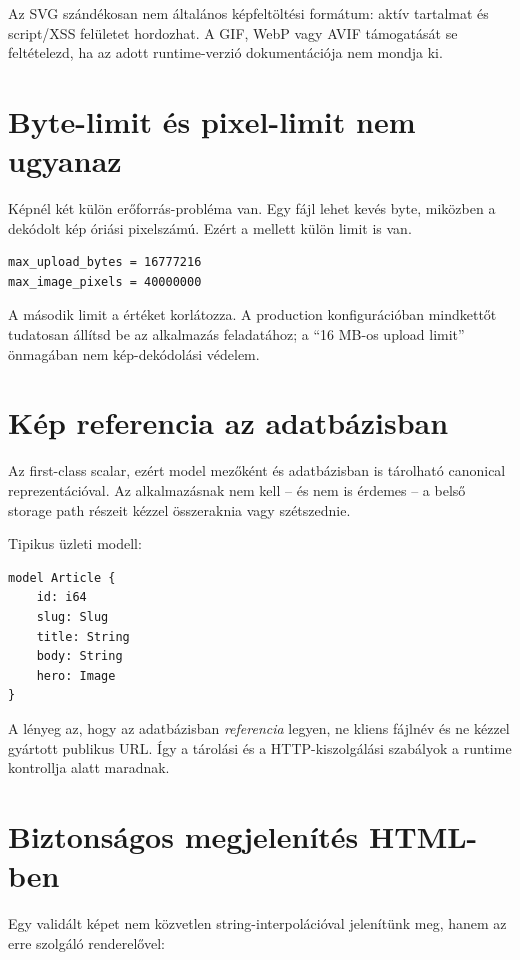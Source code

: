 Az SVG szándékosan nem általános képfeltöltési formátum: aktív tartalmat és script/XSS felületet hordozhat. A GIF, WebP vagy AVIF támogatását se feltételezd, ha az adott runtime-verzió dokumentációja nem mondja ki.

\section{Byte-limit és pixel-limit nem ugyanaz}

Képnél két külön erőforrás-probléma van. Egy fájl lehet kevés byte, miközben a dekódolt kép óriási pixelszámú. Ezért a  mellett külön  limit is van.

\begin{lstlisting}
max_upload_bytes = 16777216
max_image_pixels = 40000000
\end{lstlisting}

A második limit a  értéket korlátozza. A production konfigurációban mindkettőt tudatosan állítsd be az alkalmazás feladatához; a ``16 MB-os upload limit'' önmagában nem kép-dekódolási védelem.

\section{Kép referencia az adatbázisban}

Az  first-class scalar, ezért model mezőként és adatbázisban is tárolható canonical reprezentációval. Az alkalmazásnak nem kell -- és nem is érdemes -- a belső storage path részeit kézzel összeraknia vagy szétszednie.

Tipikus üzleti modell:

\begin{lstlisting}[language=Velran]
model Article {
    id: i64
    slug: Slug
    title: String
    body: String
    hero: Image
}
\end{lstlisting}

A lényeg az, hogy az adatbázisban \emph{referencia} legyen, ne kliens fájlnév és ne kézzel gyártott publikus URL. Így a tárolási és a HTTP-kiszolgálási szabályok a runtime kontrollja alatt maradnak.

\newpage
\section{Biztonságos megjelenítés HTML-ben}

Egy validált képet nem közvetlen string-interpolációval jelenítünk meg, hanem az erre szolgáló renderelővel:

